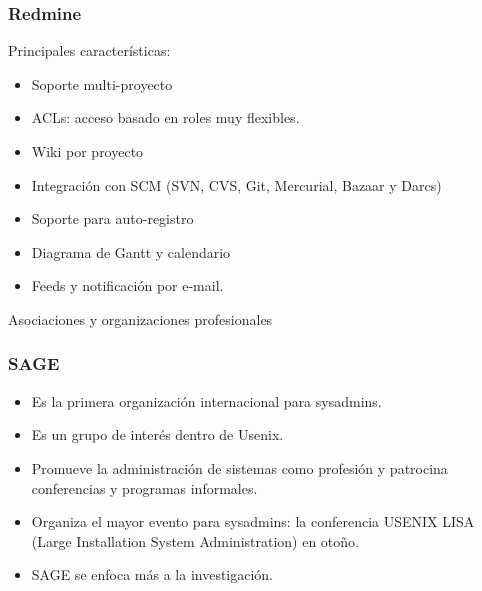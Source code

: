 \documentclass{beamer}
\begin{document}

\begin{frame}
\frametitle{Redmine}

Principales características:
\begin{itemize}
\item Soporte multi-proyecto
\item ACLs: acceso basado en roles muy flexibles. 
\item Wiki por proyecto
\item Integración con SCM (SVN, CVS, Git, Mercurial, Bazaar y Darcs)
\item Soporte para auto-registro
\item Diagrama de Gantt y calendario
\item Feeds y notificación por e-mail.
\end{itemize}
\end{frame}



\begin{frame}

\begin{center}
\huge{Asociaciones y organizaciones profesionales}
\end{center}

\end{frame}


\begin{frame}
\frametitle{SAGE}

\begin{itemize}
\item Es la primera organización internacional para sysadmins.
\item Es un grupo de interés dentro de Usenix.
\item Promueve la administración de sistemas como profesión y patrocina conferencias y programas informales.
\item Organiza el mayor evento para sysadmins: la conferencia USENIX LISA (Large Installation System Administration) en otoño.
\item SAGE se enfoca más a la investigación.
\end{itemize}
\end{frame}

\end{document}
